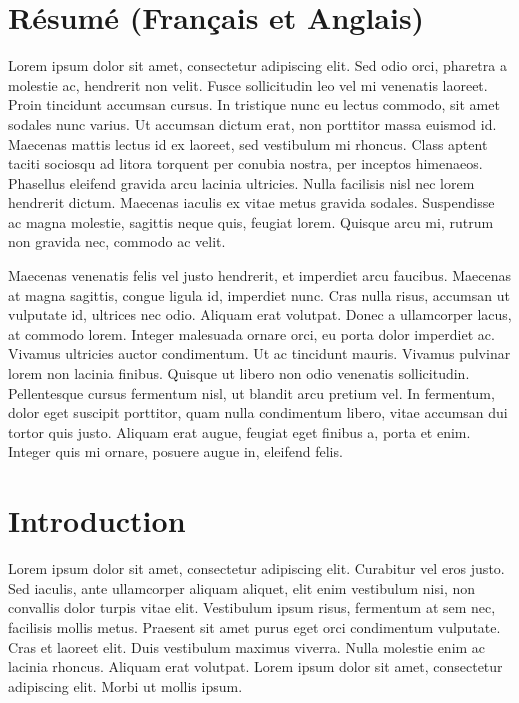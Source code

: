 \documentclass{report}
\begin{document}
\tableofcontents

\chapter{Résumé (Français et Anglais)}

Lorem ipsum dolor sit amet, consectetur adipiscing elit. Sed odio orci, pharetra a molestie ac, hendrerit non velit. Fusce sollicitudin leo vel mi venenatis laoreet. Proin tincidunt accumsan cursus. In tristique nunc eu lectus commodo, sit amet sodales nunc varius. Ut accumsan dictum erat, non porttitor massa euismod id. Maecenas mattis lectus id ex laoreet, sed vestibulum mi rhoncus. Class aptent taciti sociosqu ad litora torquent per conubia nostra, per inceptos himenaeos. Phasellus eleifend gravida arcu lacinia ultricies. Nulla facilisis nisl nec lorem hendrerit dictum. Maecenas iaculis ex vitae metus gravida sodales. Suspendisse ac magna molestie, sagittis neque quis, feugiat lorem. Quisque arcu mi, rutrum non gravida nec, commodo ac velit.

Maecenas venenatis felis vel justo hendrerit, et imperdiet arcu faucibus. Maecenas at magna sagittis, congue ligula id, imperdiet nunc. Cras nulla risus, accumsan ut vulputate id, ultrices nec odio. Aliquam erat volutpat. Donec a ullamcorper lacus, at commodo lorem. Integer malesuada ornare orci, eu porta dolor imperdiet ac. Vivamus ultricies auctor condimentum. Ut ac tincidunt mauris. Vivamus pulvinar lorem non lacinia finibus. Quisque ut libero non odio venenatis sollicitudin. Pellentesque cursus fermentum nisl, ut blandit arcu pretium vel. In fermentum, dolor eget suscipit porttitor, quam nulla condimentum libero, vitae accumsan dui tortor quis justo. Aliquam erat augue, feugiat eget finibus a, porta et enim. Integer quis mi ornare, posuere augue in, eleifend felis.


\chapter{Introduction}

Lorem ipsum dolor sit amet, consectetur adipiscing elit. Curabitur vel eros justo. Sed iaculis, ante ullamcorper aliquam aliquet, elit enim vestibulum nisi, non convallis dolor turpis vitae elit. Vestibulum ipsum risus, fermentum at sem nec, facilisis mollis metus. Praesent sit amet purus eget orci condimentum vulputate. Cras et laoreet elit. Duis vestibulum maximus viverra. Nulla molestie enim ac lacinia rhoncus. Aliquam erat volutpat. Lorem ipsum dolor sit amet, consectetur adipiscing elit. Morbi ut mollis ipsum.
\end{document}
